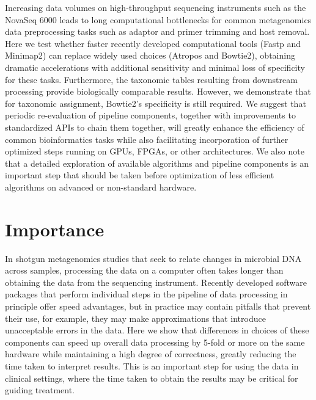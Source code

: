 \glsresetall


Increasing data volumes on high-throughput sequencing instruments such as the NovaSeq 6000 leads to long computational bottlenecks for common metagenomics data preprocessing tasks such as adaptor and primer trimming and host removal. Here we test whether faster recently developed computational tools (Fastp and Minimap2) can replace widely used choices (Atropos and Bowtie2), obtaining dramatic accelerations with additional sensitivity and minimal loss of specificity for these tasks. Furthermore, the taxonomic tables resulting from downstream processing provide biologically comparable results. However, we demonstrate that for taxonomic assignment, Bowtie2’s specificity is still required. We suggest that periodic re-evaluation of pipeline components, together with improvements to standardized APIs to chain them together, will greatly enhance the efficiency of common bioinformatics tasks while also facilitating incorporation of further optimized steps running on GPUs, FPGAs, or other architectures. We also note that a detailed exploration of available algorithms and pipeline components is an important step that should be taken before optimization of less efficient algorithms on advanced or non-standard hardware.

\section{Importance}
In shotgun metagenomics studies that seek to relate changes in microbial DNA across samples, processing the data on a computer often takes longer than obtaining the data from the sequencing instrument. Recently developed software packages that perform individual steps in the pipeline of data processing in principle offer speed advantages, but in practice may contain pitfalls that prevent their use, for example, they may make approximations that introduce unacceptable errors in the data. Here we show that differences in choices of these components can speed up overall data processing by 5-fold or more on the same hardware while maintaining a high degree of correctness, greatly reducing the time taken to interpret results. This is an important step for using the data in clinical settings, where the time taken to obtain the results may be critical for guiding treatment. 

